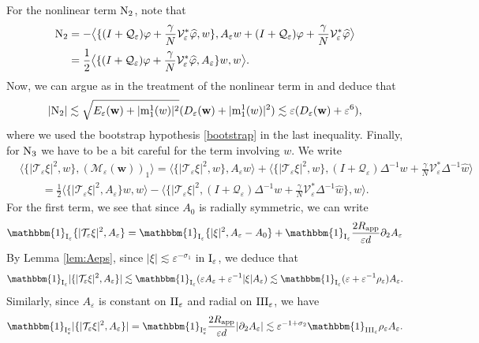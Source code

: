 \documentclass[11pt,reqno,a4paper]{amsart}
\def\eps{\varepsilon}
\def\de{{\partial}}
\newcommand{\cM}{\mathcal{M}}
\newcommand{\cQ}{\mathcal{Q}}
\newcommand{\cT}{\mathcal{T}}
\newcommand{\cV}{\mathcal{V}}
\newcommand{\mrm}{\mathrm{m}}
\newcommand{\1}{\mathbbm{1}}
\theoremstyle{definition}
\theoremstyle{definition}
\numberwithin{equation}{section}
\begin{document}
For the nonlinear term ${\rm N}_2$, note that 
\begin{align}
    {\rm N}_2&=-\big\langle\{(I+\cQ_{\eps})\varphi+\frac{\gamma}{N} \cV_\eps^*\widehat{\varphi} ,w\},A_\eps w+(I+\cQ_{\eps})\varphi+\frac{\gamma}{N} \cV_\eps^*\widehat{\varphi} \big\rangle\\
    &=\frac12\big\langle\{(I+\cQ_{\eps})\varphi+\frac{\gamma}{N} \cV_\eps^*\widehat{\varphi} ,A_\eps\}w, w\big\rangle.
\end{align}
Now, we can argue as in the treatment of the nonlinear term in \cite{dolce2024long} and deduce that 
\begin{align}
    |{\rm N}_2|\lesssim \sqrt{E_{\eps}({\mathbf w})+|\mrm_1^1(w)|^2}(D_\eps({\mathbf w})+|\mrm_1^1(w)|^2)\lesssim \eps(D_\eps({\mathbf w})+\eps^6),
\end{align}
where we used the bootstrap hypothesis \cref{bootstrap} in the last inequality.
Finally, for ${\rm N}_3$ we have to be a bit careful for the term involving $w$. We write
\begin{align}
    &\langle \{|\cT_{\eps}\xi|^2,w\},(\cM_\eps(\mathbf{w}))_1\rangle=\langle \{|\cT_{\eps}\xi|^2,w\},A_\eps w\rangle+\langle \{|\cT_{\eps}\xi|^2,w\},(I+\cQ_\eps)\Delta^{-1} w+\frac{\gamma}{N}\cV_\eps^*\Delta^{-1}\widehat{w}\rangle\\
   \label{bdN3} &\qquad =\frac12 \langle \{|\cT_{\eps}\xi|^2,A_\eps\}w,w\rangle-\langle \{|\cT_{\eps}\xi|^2,(I+\cQ_\eps)\Delta^{-1} w+\frac{\gamma}{N}\cV_\eps^*\Delta^{-1}\widehat{w}\},w\rangle.
\end{align}
For the first term, we see that since $A_0$ is radially symmetric, we can write
\begin{align}
    \mathbbm{1}_{{\rm I}_\eps}\{|\cT_{\eps}\xi|^2,A_{\eps}\}=\mathbbm{1}_{{\rm I}_\eps}\{|\xi|^2,A_{\eps}-A_0\}+\mathbbm{1}_{{\rm I}_\eps}
    \frac{2 R_{\rm app}}{\eps d}\de_2A_{\eps}
\end{align}
By Lemma \ref{lem:Aeps}, since $|\xi|\lesssim \eps^{-\sigma_1}$ in ${\rm I}_\eps$, we deduce that 
\begin{align}
       \mathbbm{1}_{{\rm I}_\eps}|\{|\cT_{\eps}\xi|^2,A_{\eps}\}|\lesssim  \mathbbm{1}_{{\rm I}_\eps}(\eps A_\eps+\eps^{-1}|\xi|A_\eps)\lesssim\mathbbm{1}_{{\rm I}_\eps} (\eps +\eps^{-1}\rho_\eps)A_{\eps}.
\end{align}
Similarly, since $A_{\eps}$ is constant on ${\rm II}_{\eps}$ and radial on ${\rm III}_\eps$, we have
\begin{align}
    \mathbbm{1}_{{\rm I}^c_\eps}|\{|\cT_{\eps}\xi|^2,A_{\eps}\}|=\mathbbm{1}_{{\rm I}^c_\eps}
    \frac{2 R_{\rm app}}{\eps d}|\de_2A_{\eps}|\lesssim \eps^{-1+\sigma_2} \mathbbm{1}_{{\rm III}_\eps}\rho_\eps A_{\eps}.
\end{align}
\end{document}
